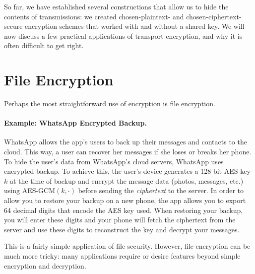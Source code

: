 So far, we have established several constructions
that allow us to hide the contents of
transmissions: we created chosen-plaintext- 
and chosen-ciphertext-secure
encryption schemes that worked with and without
a shared key.
We will now discuss a few practical applications
of transport encryption, and why it is often difficult
to get right.


\section{File Encryption}
Perhaps the most straightforward use of encryption is file encryption.

\paragraph{Example: WhatsApp Encrypted Backup.}
WhatsApp allows the app's users to back up their 
messages and contacts to the cloud.
This way, a user can recover her messages 
if she loses or breaks her phone.
To hide the user's data from WhatsApp's cloud servers, WhatsApp
uses encrypted backup.
To achieve this, the user's device generates
a 128-bit AES key $k$ at the time of backup
and encrypt the message data
(photos, messages, etc.) using AES-GCM$(k, \cdot)$
before sending the \emph{ciphertext} to the
server. In order to allow you to restore your
backup on a new phone, the app allows you to
export 64 decimal digits that encode the AES key
used. When restoring your backup, you will enter
these digits and your phone will fetch the
ciphertext from the server and use these digits to
reconstruct the key and decrypt your messages.

This is a fairly simple application of file security. However, file encryption can be much more tricky: many applications require or desire features beyond simple encryption and decryption.

